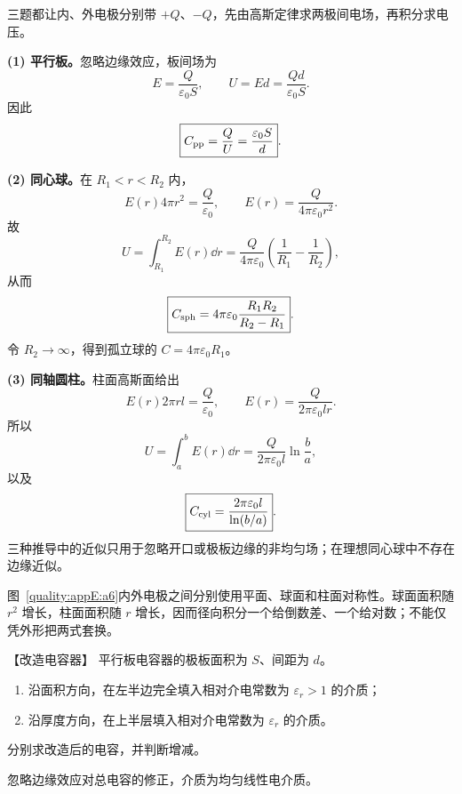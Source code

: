 \begin{xesolution}
三题都让内、外电极分别带 $+Q$、$-Q$，先由高斯定律求两极间电场，再积分求电压。

\textbf{(1) 平行板。}忽略边缘效应，板间场为
\[
  E=\frac{Q}{\varepsilon_0S},\qquad
  U=Ed=\frac{Qd}{\varepsilon_0S}.
\]
因此
\begin{equation}
  \boxed{C_{\rm pp}=\frac QU=\frac{\varepsilon_0S}{d}}.
\end{equation}

\textbf{(2) 同心球。}在 $R_1<r<R_2$ 内，
\[
  E(r)4\pi r^2=\frac Q{\varepsilon_0},
  \qquad E(r)=\frac{Q}{4\pi\varepsilon_0r^2}.
\]
故
\[
  U=\int_{R_1}^{R_2}E(r)\dd r
  =\frac{Q}{4\pi\varepsilon_0}\left(\frac1{R_1}-\frac1{R_2}\right),
\]
从而
\begin{equation}
  \boxed{C_{\rm sph}=4\pi\varepsilon_0
  \frac{R_1R_2}{R_2-R_1}}.
\end{equation}
令 $R_2\to\infty$，得到孤立球的 $C=4\pi\varepsilon_0R_1$。

\textbf{(3) 同轴圆柱。}柱面高斯面给出
\[
  E(r)2\pi rl=\frac Q{\varepsilon_0},
  \qquad E(r)=\frac{Q}{2\pi\varepsilon_0lr}.
\]
所以
\[
  U=\int_a^bE(r)\dd r=\frac{Q}{2\pi\varepsilon_0l}\ln\frac ba,
\]
以及
\begin{equation}
  \boxed{C_{\rm cyl}=\frac{2\pi\varepsilon_0l}{\ln(b/a)}}.
\end{equation}
三种推导中的近似只用于忽略开口或极板边缘的非均匀场；在理想同心球中不存在边缘近似。


图~\ref{quality:appE:a6}内外电极之间分别使用平面、球面和柱面对称性。球面面积随 $r^2$ 增长，柱面面积随 $r$ 增长，因而径向积分一个给倒数差、一个给对数；不能仅凭外形把两式套换。
\end{xesolution}

\begin{origexamplebox}{【改造电容器】}\label{appE:ex:s21-32-4}
平行板电容器的极板面积为 $S$、间距为 $d$。
\begin{enumerate}[label=(\arabic*),leftmargin=2.2em]
  \item 沿面积方向，在左半边完全填入相对介电常数为 $\varepsilon_r>1$ 的介质；
  \item 沿厚度方向，在上半层填入相对介电常数为 $\varepsilon_r$ 的介质。
\end{enumerate}
分别求改造后的电容，并判断增减。

忽略边缘效应对总电容的修正，介质为均匀线性电介质。

\end{origexamplebox}

